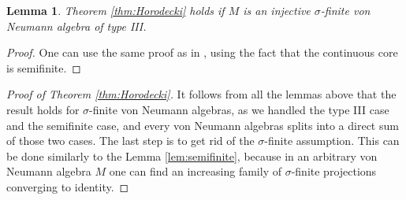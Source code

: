 \documentclass[11pt]{article}
\numberwithin{theorem}{section}
\newtheorem{lemma}[theorem]{Lemma}
\begin{document}
\begin{lemma}
Theorem \ref{thm:Horodecki} holds if $M$ is an injective $\sigma$-finite von Neumann algebra of type III.
\end{lemma}
\begin{proof}
One can use the same proof as in \cite[Lemma 3.7]{MillerOlkiewicz}, using the fact that the continuous core is semifinite.
\end{proof}
\begin{proof}[Proof of Theorem \ref{thm:Horodecki}]
It follows from all the lemmas above that the result holds for $\sigma$-finite von Neumann algebras, as we handled the type III case and the semifinite case, and every von Neumann algebras splits into a direct sum of those two cases. The last step is to get rid of the $\sigma$-finite assumption. This can be done similarly to the Lemma \ref{lem:semifinite}, because in an arbitrary von Neumann algebra $M$ one can find an increasing family of $\sigma$-finite projections converging to identity.
\end{proof}
\end{document}
